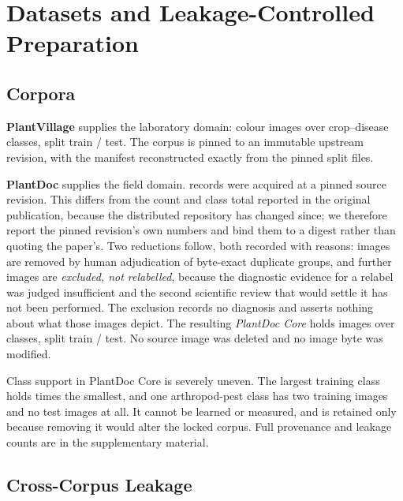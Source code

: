 \documentclass[runningheads]{llncs}
\begin{document}
\section{Datasets and Leakage-Controlled Preparation}

\subsection{Corpora}

\textbf{PlantVillage} supplies the laboratory domain: \NPv{} colour images over
\NPvClasses{} crop--disease classes, split \NPvTrain{} train / \NPvTest{} test.
The corpus is pinned to an immutable upstream revision, with the manifest
reconstructed exactly from the pinned split files.

\textbf{PlantDoc} \cite{singh2020plantdoc} supplies the field domain.
\NPdcAcquired{} records were acquired at a pinned source revision. This differs
from the count and class total reported in the original publication, because the
distributed repository has changed since; we therefore report the pinned
revision's own numbers and bind them to a digest rather than quoting the paper's.
Two reductions follow, both recorded with reasons: \NPdcExcludedDup{} images are
removed by human adjudication of byte-exact duplicate groups, and
\NPdcExcludedReview{} further images are \emph{excluded, not relabelled},
because the diagnostic evidence for a relabel was judged insufficient and the
second scientific review that would settle it has not been performed. The
exclusion records no diagnosis and asserts nothing about what those images
depict. The resulting \emph{PlantDoc Core} holds \NPdc{} images over
\NPdcClasses{} classes, split \NPdcTrain{} train / \NPdcTest{} test. No source
image was deleted and no image byte was modified.

Class support in PlantDoc Core is severely uneven. The largest training class
holds \PdcImbalance{} times the smallest, and one arthropod-pest class has two
training images and no test images at all. It cannot be learned or measured, and
is retained only because removing it would alter the locked corpus. Full provenance and leakage
counts are in the supplementary material.

\subsection{Cross-Corpus Leakage}
\end{document}
